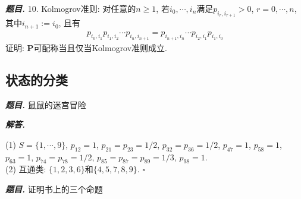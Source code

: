 \documentclass[10pt, a4paper, oneside]{ctexart}
\newenvironment{problem}{\begin{framed}\par\noindent\textbf{\textit{题目. }}}{\end{framed}\par}
\newenvironment{solution}{%
  \par\noindent\textbf{\textit{解答. }}\ignorespaces
}{%
  \hfill\ensuremath{\square}\par %
}
\begin{document}
\begin{problem}
10. Kolmogrov准则: 对任意的$n\geq 1$, 若$i_0,\cdots,i_n$满足$p_{i_r,i_{r+1}}>0$, $r=0,\cdots,n$, 其中$i_{n+1}:=i_0$, 且有
\begin{align*}
    p_{i_0,i_1}p_{i_1,i_2}\cdots p_{i_n,i_{n+1}}=p_{i_{n+1},i_n}\cdots p_{i_2,i_1}p_{i_1,i_0}
\end{align*}
证明: $\mathbf{P}$可配称当且仅当Kolmogrov准则成立.
\end{problem}

\subsection{状态的分类}
\begin{problem}
    鼠鼠的迷宫冒险
\end{problem}
\begin{solution}
(1) $S=\{1,\cdots,9\}$, $p_{12}=1$, $p_{21}=p_{23}=1/2$, $p_{32}=p_{36}=1/2$, $p_{47}=1$, $p_{58}=1$, $p_{63}=1$, $p_{74}=p_{78}=1/2$, $p_{85}=p_{87}=p_{89}=1/3$, $p_{98}=1$.\\
(2) 互通类: $\{1,2,3,6\}$和$\{4,5,7,8,9\}$.  
\end{solution}

\begin{problem}
    证明书上的三个命题
\end{problem}
\end{document}
